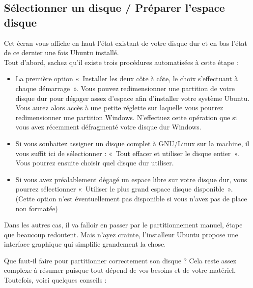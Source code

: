 \subsection{Sélectionner un disque / Préparer l'espace disque}
\label{RefFormatPartition}
Cet écran vous affiche en haut l'état existant de votre disque dur et en bas l'état de ce dernier une fois Ubuntu installé.\\
Tout d'abord, sachez qu'il existe trois procédures automatisées à cette étape :
\begin{itemize}
\item La première option «~Installer les deux côte à côte, le choix s'effectuant à chaque démarrage~». Vous pouvez redimensionner une partition de votre disque dur pour dégager assez d'espace afin d'installer votre système Ubuntu. Vous aurez alors accès à une petite réglette sur laquelle vous pourrez redimensionner une partition Windows. N'effectuez cette opération que si vous avez récemment défragmenté votre disque dur Windows.
\item Si vous souhaitez assigner un disque complet à GNU/Linux sur la machine, il vous suffit ici de sélectionner : «~Tout effacer et utiliser le disque entier~». Vous pourrez ensuite choisir quel disque dur utiliser.
\item Si vous avez préalablement dégagé un espace libre sur votre disque dur, vous pourrez sélectionner «~Utiliser le plus grand espace disque disponible~». (Cette option n'est éventuellement pas disponible si vous n'avez pas de place non formatée)
\end{itemize}\par
{}
Dans les autres cas, il va falloir en passer par le partitionnement manuel, étape que beaucoup redoutent. Mais n'ayez crainte, l'installeur Ubuntu propose une interface graphique qui simplifie grandement la chose.\par
Que faut-il faire pour partitionner correctement son disque ? Cela reste assez complexe à résumer puisque tout dépend de vos besoins et de votre matériel. Toutefois, voici quelques conseils :
